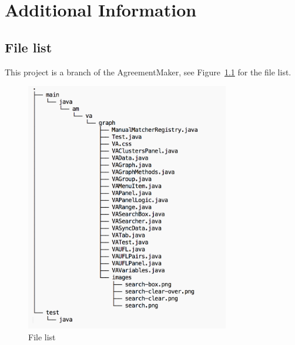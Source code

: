 
\chapter{Additional Information}
\section{File list}
This project is a branch of the AgreementMaker, see Figure~\ref{fig:file_list} for the file list.

\begin{figure}[htb]
	\centering
	\includegraphics[width=3.5in]{pics/Code_structure.png}
	\caption{File list}
	\label{fig:file_list}
\end{figure}


